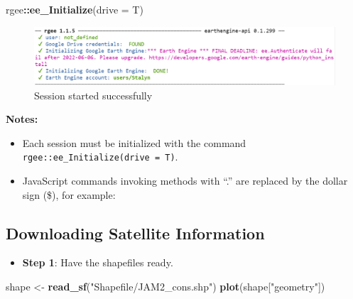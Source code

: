 \documentclass[
  12pt,
]{book}
\newenvironment{Shaded}{\begin{snugshade}}{\end{snugshade}}
\newcommand{\AttributeTok}[1]{\textcolor[rgb]{0.13,0.29,0.53}{#1}}
\newcommand{\CommentTok}[1]{\textcolor[rgb]{0.56,0.35,0.01}{\textit{#1}}}
\newcommand{\FunctionTok}[1]{\textcolor[rgb]{0.13,0.29,0.53}{\textbf{#1}}}
\newcommand{\NormalTok}[1]{#1}
\newcommand{\OtherTok}[1]{\textcolor[rgb]{0.56,0.35,0.01}{#1}}
\newcommand{\SpecialCharTok}[1]{\textcolor[rgb]{0.81,0.36,0.00}{\textbf{#1}}}
\newcommand{\StringTok}[1]{\textcolor[rgb]{0.31,0.60,0.02}{#1}}
\providecommand{\tightlist}{%
  \setlength{\itemsep}{0pt}\setlength{\parskip}{0pt}}
\begin{document}
\begin{Shaded}
\begin{Highlighting}[]
\NormalTok{rgee}\SpecialCharTok{::}\FunctionTok{ee\_Initialize}\NormalTok{(}\AttributeTok{drive =}\NormalTok{ T)}
\end{Highlighting}
\end{Shaded}

\begin{figure}
\centering
\includegraphics{Recursos/01_Session1/03_Figura.PNG}
\caption{Session started successfully}
\end{figure}

\textbf{Notes:}

\begin{itemize}
\item
  Each session must be initialized with the command \texttt{rgee::ee\_Initialize(drive\ =\ T)}.
\item
  JavaScript commands invoking methods with ``.'' are replaced by the dollar sign (\$), for example:
\end{itemize}

\begin{Shaded}
\end{Shaded}

\hypertarget{downloading-satellite-information}{%
\subsection{Downloading Satellite Information}\label{downloading-satellite-information}}

\begin{itemize}
\tightlist
\item
  \textbf{Step 1}: Have the shapefiles ready.
\end{itemize}

\begin{Shaded}
\begin{Highlighting}[]
\NormalTok{shape }\OtherTok{\textless{}{-}} \FunctionTok{read\_sf}\NormalTok{(}\StringTok{"Shapefile/JAM2\_cons.shp"}\NormalTok{) }
\FunctionTok{plot}\NormalTok{(shape[}\StringTok{"geometry"}\NormalTok{])}
\end{Highlighting}
\end{Shaded}
\end{document}
